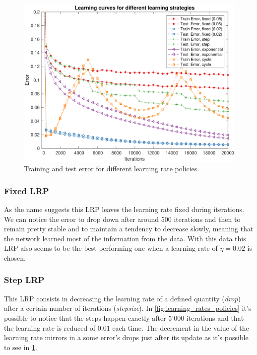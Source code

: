 \begin{figure}
	\centering
	\includegraphics[width=\columnwidth]{figures/error_strategies.pdf}
	\caption{Training and test error for different learning rate policies.}
	\label{fig:lrp_training_error}
\end{figure}

\subsubsection{Fixed LRP}
As the name suggests this LRP leaves the learning rate fixed during iterations. We can notice the error to drop down after around 500 iterations and then
to remain pretty stable and to maintain a tendency to decrease slowly, meaning that the network learned most
of the information from the data. With this data this LRP also seems to be the best performing one when a learning rate of $\eta = 0.02$ is chosen.

\subsubsection{Step LRP}
This LRP consists in decreasing the learning rate of a defined quantity (\textit{drop}) after a certain number of iterations
(\textit{stepsize}). In \cref{fig:learning_rates_policies} it's possible to notice that the steps happen exactly after 5'000 iterations and that
the learning rate is reduced of $0.01$ each time.
The decrement in the value of the learning rate mirrors in a some error's drops just after its update as it's possible to see in \cref{fig:lrp_training_error}.


